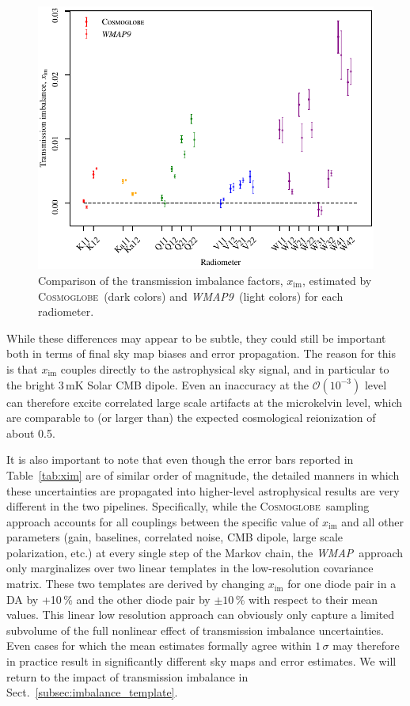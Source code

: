 \documentclass[twocolumn]{../../common/aa}
\def\WMAP{\emph{WMAP}}
\def\WMAPnine{\emph{WMAP9}}
\newcommand{\cosmoglobe}{\textsc{Cosmoglobe}}
\begin{document}
\begin{figure}[t]
	\centering
	\includegraphics[width=\linewidth]{figures/x_im_CG_v1.pdf}
	\caption{Comparison of the transmission imbalance factors, $x_{\mathrm{im}}$, estimated by \cosmoglobe\ (dark colors) and \WMAPnine\ (light colors) for each radiometer.}
	\label{fig:x_im}
\end{figure}

While these differences may appear to be subtle, they could still be important both in terms of final sky map biases and error propagation. The reason for this is that $x_{\mathrm{im}}$ couples directly to the astrophysical sky signal, and in particular to the bright 3\,mK Solar CMB dipole. Even an inaccuracy at the $\mathcal{O}(10^{-3})$ level can therefore excite correlated large scale artifacts at the microkelvin level, which are comparable to (or larger than) the expected cosmological reionization of about 0.5\muK.

It is also important to note that even though the error bars reported in Table~\ref{tab:xim} are of similar order of magnitude, the detailed manners in which these uncertainties are propagated into higher-level astrophysical results are very different in the two pipelines. Specifically, while the \cosmoglobe\ sampling approach accounts for all couplings between the specific value of $x_{\mathrm{im}}$ and all other parameters (gain, baselines, correlated noise, CMB dipole, large scale polarization, etc.) at every single step of the Markov chain, the \WMAP\ approach only marginalizes over two linear templates in the low-resolution covariance matrix. These two templates are derived by changing $x_{\mathrm{im}}$ for one diode pair in a DA by +10\,\% and the other diode pair by $\pm10$\,\% with respect to their mean values. This linear low resolution approach can obviously only capture a limited subvolume of the full nonlinear effect of transmission imbalance uncertainties. Even cases for which the mean estimates formally agree within $1\,\sigma$ may therefore in practice result in significantly different sky maps and error estimates. We will return to the impact of transmission imbalance in Sect.~\ref{subsec:imbalance_template}.
\end{document}
